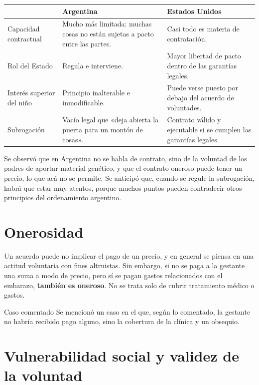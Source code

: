 \documentclass[12pt,oneside]{book}
\begin{document}
\begin{table}[H]
\centering
\small
\begin{tabularx}{\textwidth}{
    >{\raggedright\arraybackslash}p{}
    >{\raggedright\arraybackslash}X
    >{\raggedright\arraybackslash}X
}
\toprule
 & \textbf{Argentina} & \textbf{Estados Unidos} \\
\midrule
Capacidad contractual & Mucho más limitada: muchas cosas no están sujetas a pacto entre las partes. & Casi todo es materia de contratación. \\
Rol del Estado & Regula e interviene. & Mayor libertad de pacto dentro de las garantías legales. \\
Interés superior del niño & Principio inalterable e inmodificable. & Puede verse puesto por debajo del acuerdo de voluntades. \\
Subrogación & Vacío legal que «deja abierta la puerta para un montón de cosas». & Contrato válido y ejecutable si se cumplen las garantías legales. \\
\bottomrule
\end{tabularx}
\end{table}

Se observó que en Argentina no se habla de contrato, sino de la voluntad de los padres de aportar material genético, y que el contrato oneroso puede tener un precio, lo que acá no se permite. Se anticipó que, cuando se regule la subrogación, habrá que estar muy atentos, porque muchos puntos pueden contradecir otros principios del ordenamiento argentino.

\section{Onerosidad}

Un acuerdo puede no implicar el pago de un precio, y en general se piensa en una actitud voluntaria con fines altruistas. Sin embargo, si no se paga a la gestante una suma a modo de precio, pero sí se pagan gastos relacionados con el embarazo, \textbf{también es oneroso}. No se trata solo de cubrir tratamiento médico o gastos.

\begin{example}{Caso comentado}
Se mencionó un caso en el que, según lo comentado, la gestante no habría recibido pago alguno, sino la cobertura de la clínica y un obsequio.
\end{example}

\section{Vulnerabilidad social y validez de la voluntad}
\end{document}

